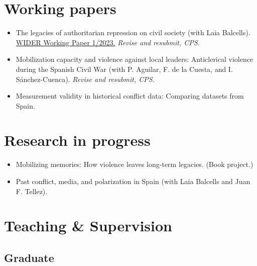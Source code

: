 \documentclass[a4paper, 12pt]{article}
\begin{document}
\section*{Working papers}

\begin{itemize}[leftmargin=*, nolistsep]
\item The legacies of authoritarian repression on civil society (with Laia Balcells).\\\href{https://doi.org/10.35188/UNU-WIDER/2023/309-3}{WIDER Working Paper 1/2023.} \textit{Revise and resubmit, CPS.}
\item Mobilization capacity and violence against local leaders: Anticlerical violence during the Spanish Civil War (with P. Aguilar, F. de la Cuesta, and I. Sánchez-Cuenca). \textit{Revise and resubmit, CPS.}
\item Measurement validity in historical conflict data: Comparing datasets from Spain.
\end{itemize}

\section*{Research in progress}

\begin{itemize}[leftmargin=*, nolistsep]
\item Mobilizing memories: How violence leaves long-term legacies. (Book project.)
\item Past conflict, media, and polarization in Spain (with Laia Balcells and Juan F. Tellez).
\end{itemize}

\section*{Teaching \& Supervision}


\subsection*{Graduate}
\end{document}
